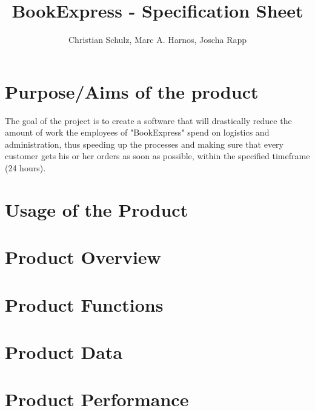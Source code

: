\documentclass[a4paper]{report}
\author{Christian Schulz, Marc A. Harnos, Joscha Rapp}
\begin{document}
\title{BookExpress - Specification Sheet}
\maketitle
\tableofcontents

\chapter{Purpose/Aims of the product}
\let\clearpage\relax
The goal of the project is to create a software that will drastically reduce the amount of work the employees of "BookExpress" spend on logistics and administration, thus speeding up the processes and making sure that every customer gets his or her orders as soon as possible, within the specified timeframe (24 hours). 
\\
\chapter{Usage of the Product}
\chapter{Product Overview}
\chapter{Product Functions}
\chapter{Product Data}
\chapter{Product Performance}
\end{document}
